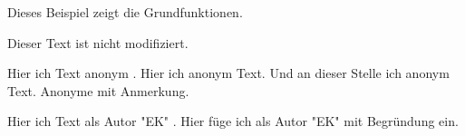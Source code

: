 \documentclass{article}
\begin{document}
	Dieses Beispiel zeigt die Grundfunktionen.

	\listofchanges

	Dieser Text ist nicht modifiziert.

	Hier  ich Text anonym .
	Hier  ich anonym Text.
	Und an dieser Stelle  ich anonym Text.
	Anonyme  mit Anmerkung.

	Hier  ich Text als Autor "EK" .
	Hier f\"uge ich 	als Autor "EK" mit Begr\"undung ein.
\end{document}
